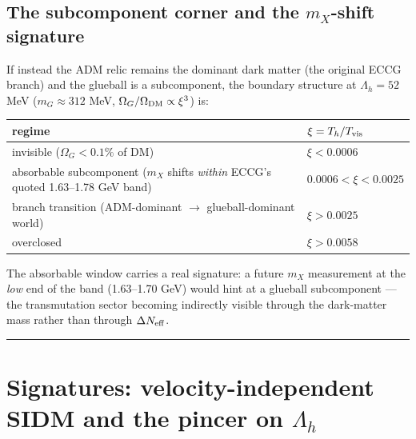 \documentclass[preprint,12pt]{elsarticle}
\begin{document}
\subsection{\texorpdfstring{The subcomponent corner and the
\(m_X\)-shift
signature}{The subcomponent corner and the -shift signature}}\label{sec-5-4}

If instead the ADM relic remains the dominant dark matter (the original
ECCG branch) and the glueball is a subcomponent, the boundary structure
at \(\Lambda_h = 52\) MeV (\(m_G \approx 312\) MeV,
\(\Omega_G/\Omega_{\rm DM} \propto \xi^3\)) is:

\begin{longtable}[]{@{}
  >{\raggedright\arraybackslash}p{}
  >{\raggedright\arraybackslash}p{}@{}}
\toprule\noalign{}
\begin{minipage}[b]{\linewidth}\raggedright
regime
\end{minipage} & \begin{minipage}[b]{\linewidth}\raggedright
\(\xi = T_h/T_{\rm vis}\)
\end{minipage} \\
\midrule\noalign{}
\endhead
\bottomrule\noalign{}
\endlastfoot
invisible (\(\Omega_G < 0.1\%\) of DM) & \(\xi < 0.0006\) \\
absorbable subcomponent (\(m_X\) shifts \emph{within} ECCG's quoted
1.63--1.78 GeV band) & \(0.0006 < \xi < 0.0025\) \\
branch transition (ADM-dominant \(\to\) glueball-dominant world) &
\(\xi > 0.0025\) \\
overclosed & \(\xi > 0.0058\) \\
\end{longtable}

The absorbable window carries a real signature: a future \(m_X\)
measurement at the \emph{low} end of the band (1.63--1.70 GeV) would
hint at a glueball subcomponent --- the transmutation sector becoming
indirectly visible through the dark-matter mass rather than through
\(\Delta N_{\rm eff}\).

\begin{center}\rule{0.5\linewidth}{0.5pt}\end{center}

\section{\texorpdfstring{Signatures: velocity-independent SIDM and the
pincer on
\(\Lambda_h\)}{Signatures: velocity-independent SIDM and the pincer on }}\label{sec-6}
\end{document}
